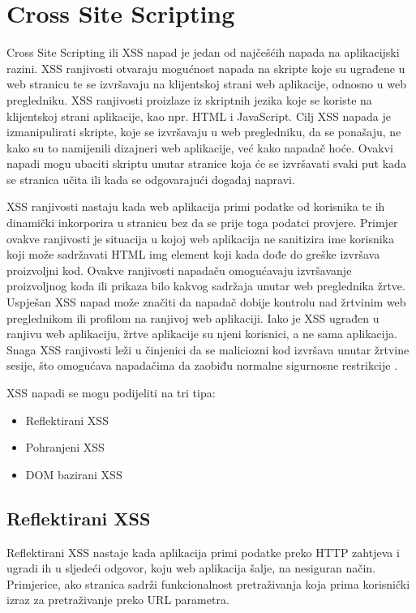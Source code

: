 \documentclass[12pt, oneside, onecolumn]{book}
\begin{document}
{\section{Cross Site Scripting}
Cross Site Scripting ili XSS napad je jedan od najčešćih napada na aplikacijski razini. XSS ranjivosti otvaraju mogućnost napada na skripte koje su ugrađene u web stranicu te se izvršavaju na klijentskoj strani web aplikacije, odnosno u web pregledniku. XSS ranjivosti proizlaze iz skriptnih jezika koje se koriste na klijentskoj strani aplikacije, kao npr. HTML i JavaScript. Cilj XSS napada je izmanipulirati skripte, koje se izvršavaju u web pregledniku, da se ponašaju, ne kako su to namijenili dizajneri web aplikacije, već kako napadač hoće. Ovakvi napadi mogu ubaciti skriptu unutar stranice koja će se izvršavati svaki put kada se stranica učita ili kada se odgovarajući događaj napravi.

XSS ranjivosti nastaju kada web aplikacija primi podatke od korisnika te ih dinamički inkorporira u stranicu bez da se prije toga podatci provjere. Primjer ovakve ranjivosti je situacija u kojoj web aplikacija ne sanitizira ime korisnika koji može sadržavati HTML img element koji kada dođe do greške izvršava proizvoljni kod. Ovakve ranjivosti napadaču omogućavaju izvršavanje proizvoljnog koda ili prikaza bilo kakvog sadržaja unutar web preglednika žrtve. Uspješan XSS napad može značiti da napadač dobije kontrolu nad žrtvinim web preglednikom ili profilom na ranjivoj web aplikaciji. Iako je XSS ugrađen u ranjivu web aplikaciju, žrtve aplikacije su njeni korisnici, a ne sama aplikacija. Snaga XSS ranjivosti leži u činjenici da se maliciozni kod izvršava unutar žrtvine sesije, što omogućava napadačima da zaobiđu normalne sigurnosne restrikcije \cite{xsstut}.

XSS napadi se mogu podijeliti na tri tipa:

\begin{itemize}
\item Reflektirani XSS
\item Pohranjeni XSS
\item DOM bazirani XSS
\end{itemize}

\subsection{Reflektirani XSS}
Reflektirani XSS nastaje kada aplikacija primi podatke preko HTTP zahtjeva i ugradi ih u sljedeći odgovor, koju web aplikacija šalje, na nesiguran način. Primjerice, ako stranica sadrži funkcionalnost pretraživanja koja prima korisnički izraz za pretraživanje preko URL parametra.

}
\end{document}
